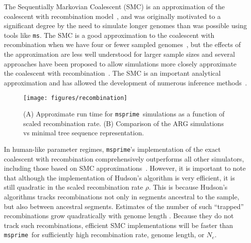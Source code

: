 \documentclass{article}
\newcommand{\msprime}[0]{\texttt{msprime}}
\newcommand{\ms}[0]{\texttt{ms}}
\begin{document}
The Sequentially Markovian Coalescent (SMC) is an approximation of the
coalescent with recombination
model~\citep{mcvean2005approximating,marjoram2006fast},
and was originally motivated to a significant degree by the need to
simulate longer genomes than was possible using tools like \ms.
The SMC is a good approximation to the
coalescent with recombination when we have four or fewer sampled
genomes~\citep{hobolth2014markovian,wilton2015smc}, but the
effects of the approximation are less well understood for larger
sample sizes and several approaches have been proposed to
allow simulations more closely approximate the coalescent
with recombination~\citep{chen2009fast,wang2014new,staab2015scrm}.
The SMC is an important analytical approximation
and has allowed the development of numerous inference
methods~\citep{
li2011inference,
harris2013inferring,
sheehan2013estimating,
schiffels2014inferring,
carmi2014renewal,
rasmussen2014genome,
zheng2014bayesian,
terhorst2017robust}.

\begin{figure}
\texttt{[image: figures/recombination]}
\caption{\label{fig-recombination-perf}(A) Approximate run time for \msprime\
simulations as a function of scaled recombination rate.
(B) Comparison of the ARG simulations vs minimal tree sequence representation.}
\end{figure}

In human-like parameter regimes, \msprime's implementation of the
exact coalescent with recombination comprehensively outperforms
all other simulators, including those based on SMC
approximations~\citep{kelleher2016efficient}. However, it is important
to note that although the implementation of Hudson's algorithm is
very efficient, it is still quadratic in the scaled recombination rate
$\rho$. This is because Hudson's algorithms tracks recombinations not only
in segments ancestral to the sample, but also between ancestral segments.
Estimates of the number of such ``trapped'' recombinations grow quadratically
with genome length \citep[Eq.~5.10]{hein2004gene}.
Because they do not track such recombinations, efficient SMC implementations
will be faster than \msprime\ for sufficiently high recombination rate,
genome length, or $N_e$. %
\end{document}
